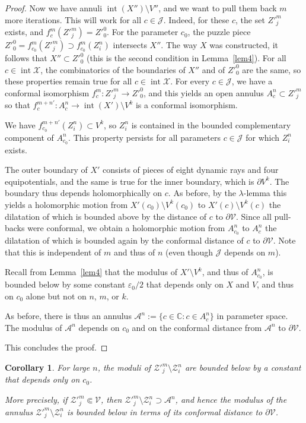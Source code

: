 \documentclass[12pt,a4paper]{amsart}
\newtheorem{cor}[theorem]{Corollary}
\newcommand{\C}{\mathbb{C}}
\newcommand{\JJ}{\mathcal J}
\renewcommand{\AA}{\mathcal A}
\newcommand{\VV}{\mathcal V}
\newcommand{\XX}{\mathcal X}
\newcommand{\ZZ}{\mathcal Z}
\newcommand{\eps}{\varepsilon}
\newcommand{\sm}{\setminus}
\newcommand{\intr}{\operatorname{int}}
\begin{document}
\begin{proof}
Now we have annuli $\intr(X'')\sm V''$, and we want to pull them
back $m$ more iterations. This will work for all $c\in\JJ$. Indeed,
for these $c$, the set $Z'^m_j$ exists, and $f^m_c(Z'^m_j)=Z'^0_0$.
For the parameter $c_0$, the puzzle piece
$Z'^0_0=f^m_{c_0}(Z'^m_j)\supset f^m_{c_0}(Z^n_i)$ intersects $X''$.
The way $X$ was constructed, it follows that $X''\subset Z'^0_0$
(this is the second condition in Lemma~\ref{lem4}). For all
$c\in\intr\XX$, the combinatorics of the boundaries of $X''$ and of
$Z'^0_0$ are the same, so these properties remain true for all
$c\in\intr\XX$. For every $c\in\JJ$, we have a conformal isomorphism
$f^m_c\colon  Z'^m_j\to  Z'^0_0$, and this yields an open annulus
$A^n_c\subset Z'^m_j$ so that $f^{m+n'}_c\colon A^n_c\to
\intr(X')\sm V^k$ is a conformal isomorphism.

We have $f^{m+n'}_{c_0}(Z^n_i)\subset V^k$, so $Z^n_i$ is contained
in the bounded complementary component of $A^n_{c_0}$. This property
persists for all parameters $c\in\JJ$ for which $Z^n_i$ exists.


The outer boundary of $X'$ consists of pieces of eight dynamic rays
and four equipotentials, and the same is true for the inner
boundary, which is $\partial V^k$. The boundary thus depends
holomorphically on $c$. As before, by the $\lambda$-lemma this
yields a holomorphic motion from $X'(c_0)\sm V^k(c_0)$ to $X'(c)\sm
V^k(c)$ the dilatation of which is bounded above by the distance of
$c$ to $\partial\VV$. Since all pull-backs were conformal, we obtain
a holomorphic motion from $A^n_{c_0}$ to $A^n_c$ the dilatation of
which is bounded again by the conformal distance of $c$ to
$\partial\VV$. Note that this is independent of $m$ and thus of $n$
(even though $\JJ$ depends on $m$).

Recall from Lemma~\ref{lem4} that the modulus of $X'\sm V^k$, and
thus of $A^n_{c_0}$, is bounded below by some constant $\eps_0/2$
that depends only on $X$ and $V$, and thus on $c_0$ alone but not on
$n$, $m$, or $k$.

As before, there is thus an annulus $\AA^n:=\{c\in\C\colon c\in
A^n_c\}$ in parameter space. The modulus of $\AA^n$ depends on $c_0$
and on the conformal distance from $\AA^n$ to $\partial\VV$.

This concludes the proof.
\end{proof}





\begin{cor}
For large $n$, the moduli of $\ZZ'^m_j\sm \ZZ^n_i$ are bounded below
by a constant that depends only on $c_0$.

More precisely, if $\ZZ'^m_j\Subset \VV$, then $\ZZ'^m_j\setminus
\ZZ^n_i\supset\AA^n$, and hence the modulus of the annulus
$\ZZ'^m_j\setminus \ZZ^n_i$ is bounded below in terms of its
conformal distance to $\partial\VV$.
\end{cor}
\end{document}
